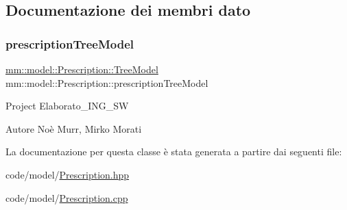 \subsection{Documentazione dei membri dato}
\mbox{\label{classmm_1_1model_1_1_prescription_a5dd928aaafb51cd30d4183df7697ce49}} 
\subsubsection{\texorpdfstring{prescription\+Tree\+Model}{prescriptionTreeModel}}
{\footnotesize\ttfamily \mbox{\hyperlink{structmm_1_1model_1_1_prescription_1_1_tree_model}{mm\+::model\+::\+Prescription\+::\+Tree\+Model}} mm\+::model\+::\+Prescription\+::prescription\+Tree\+Model\hspace{0.3cm}{\ttfamily [static]}}

Project Elaborato\+\_\+\+I\+N\+G\+\_\+\+SW \begin{DoxyAuthor}{Autore}
Noè Murr, Mirko Morati 
\end{DoxyAuthor}


La documentazione per questa classe è stata generata a partire dai seguenti file\+:\begin{DoxyCompactItemize}
\item 
code/model/\mbox{\hyperlink{_prescription_8hpp}{Prescription.\+hpp}}\item 
code/model/\mbox{\hyperlink{_prescription_8cpp}{Prescription.\+cpp}}\end{DoxyCompactItemize}
